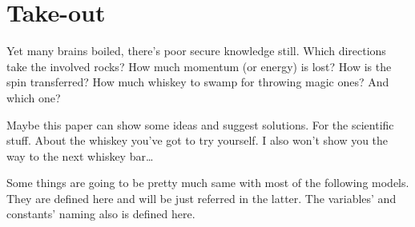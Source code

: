 
\chapter{Take-out}

Yet many brains boiled, there's poor secure knowledge still. Which directions
take the involved rocks? How much momentum (or energy) is lost? How is the spin
transferred? How much whiskey to swamp for throwing magic ones? And which one?

Maybe this paper can show some ideas and suggest solutions. For the scientific
stuff. About the whiskey you've got to try yourself. I also won't show you the
way to the next whiskey bar\dots

\vspace{1em}
Some things are going to be pretty much same with most of the following models.
They are defined here and will be just referred in the latter. The variables'
and constants' naming also is defined here.

